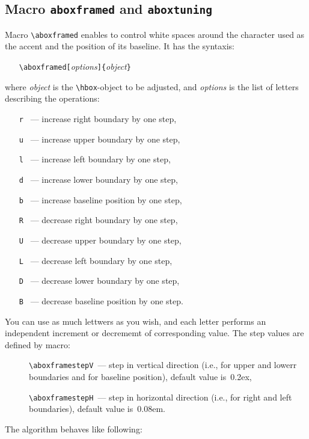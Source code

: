 \subsection{Macro {\tt\bs{}aboxframed} and {\tt\bs{}aboxtuning}}

Macro \verb?\aboxframed? enables to control white spaces
around the character used as the accent and the position
of its baseline. It has the syntaxis:
\begin{itemize}
\item[]\verb?\aboxframed[?{\em options}\verb?]{?{\em object}\verb?}?
\end{itemize}
where {\em object} is the \verb?\hbox?-object to be adjusted,
and {\em options} is the list of letters describing the operations:
\begin{itemize}
\item[\texttt{r}]~--- increase right boundary by one step,
\item[\texttt{u}]~--- increase upper boundary by one step,
\item[\texttt{l}]~--- increase left boundary by one step,
\item[\texttt{d}]~--- increase lower boundary by one step,
\item[\texttt{b}]~--- increase baseline position by one step,
\item[\texttt{R}]~--- decrease right boundary by one step,
\item[\texttt{U}]~--- decrease upper boundary by one step,
\item[\texttt{L}]~--- decrease left boundary by one step,
\item[\texttt{D}]~--- decrease lower boundary by one step,
\item[\texttt{B}]~--- decrease baseline position by one step.
\end{itemize}
You can use as much lettwers as you wish, and each letter
performs an independent increment or decrememt of corresponding value.
The step values are defined by macro:
\begin{description}
\item[]\verb?\aboxframestepV?~--- step in vertical direction
       (i.e., for upper and lowerr boundaries and for baseline position),
       default value is~\textsf{0.2ex},
\item[]\verb?\aboxframestepH?~--- step in horizontal direction
       (i.e., for right and left boundaries),
       default value is~\textsf{0.08em}.
\end{description}
The algorithm behaves like following:
